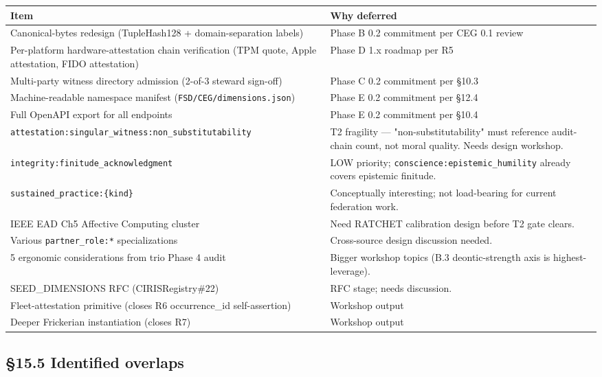 \documentclass[11pt]{article}
\begin{document}
{\footnotesize
\begin{longtable}{|p{8.0cm}|p{8.0cm}|}\hline
\textbf{Item} & \textbf{Why deferred} \\ \hline\endhead
Canonical-bytes redesign (TupleHash128 + domain-separation labels) & Phase B 0.2 commitment per CEG 0.1 review \\ \hline
Per-platform hardware-attestation chain verification (TPM quote, Apple attestation, FIDO attestation) & Phase D 1.x roadmap per R5 \\ \hline
Multi-party witness directory admission (2-of-3 steward sign-off) & Phase C 0.2 commitment per §10.3 \\ \hline
Machine-readable namespace manifest (\texttt{FSD/CEG/dimensions.json}) & Phase E 0.2 commitment per §12.4 \\ \hline
Full OpenAPI export for all endpoints & Phase E 0.2 commitment per §10.4 \\ \hline
\texttt{attestation:singular\_witness:non\_substitutability} & T2 fragility — "non-substitutability" must reference audit-chain count, not moral quality. Needs design workshop. \\ \hline
\texttt{integrity:finitude\_acknowledgment} & LOW priority; \texttt{conscience:epistemic\_humility} already covers epistemic finitude. \\ \hline
\texttt{sustained\_practice:\{kind\}} & Conceptually interesting; not load-bearing for current federation work. \\ \hline
IEEE EAD Ch5 Affective Computing cluster & Need RATCHET calibration design before T2 gate clears. \\ \hline
Various \texttt{partner\_role:*} specializations & Cross-source design discussion needed. \\ \hline
5 ergonomic considerations from trio Phase 4 audit & Bigger workshop topics (B.3 deontic-strength axis is highest-leverage). \\ \hline
SEED\_DIMENSIONS RFC (CIRISRegistry\#22) & RFC stage; needs discussion. \\ \hline
Fleet-attestation primitive (closes R6 occurrence\_id self-assertion) & Workshop output \\ \hline
Deeper Frickerian instantiation (closes R7) & Workshop output \\ \hline
\end{longtable}}


\subsection*{§15.5 Identified overlaps}
\end{document}
